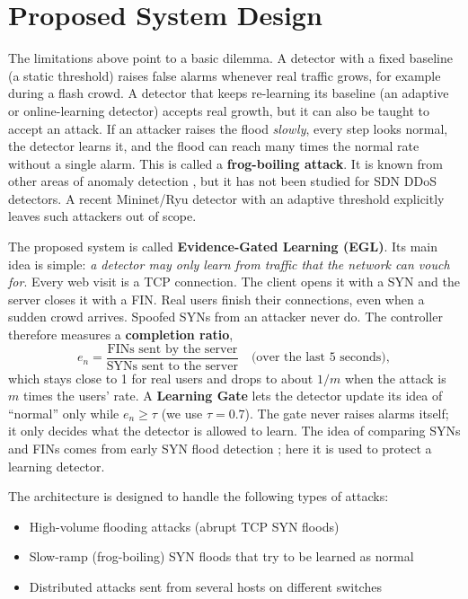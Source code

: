 \documentclass[12pt,a4paper]{article}
\begin{document}
\section{Proposed System Design}
The limitations above point to a basic dilemma. A detector with a fixed
baseline (a static threshold) raises false alarms whenever real traffic grows,
for example during a flash crowd. A detector that keeps re-learning its
baseline (an adaptive or online-learning detector) accepts real growth, but it
can also be taught to accept an attack. If an attacker raises the flood
\emph{slowly}, every step looks normal, the detector learns it, and the flood
can reach many times the normal rate without a single alarm. This is called a
\textbf{frog-boiling attack}. It is known from other areas of anomaly detection
\cite{antidote,chantin}, but it has not been studied for SDN DDoS detectors.
A recent Mininet/Ryu detector with an adaptive threshold \cite{zhang2026}
explicitly leaves such attackers out of scope.

The proposed system is called \textbf{Evidence-Gated Learning (EGL)}. Its main
idea is simple: \emph{a detector may only learn from traffic that the network
can vouch for}. Every web visit is a TCP connection. The client opens it with a
SYN and the server closes it with a FIN. Real users finish their connections,
even when a sudden crowd arrives. Spoofed SYNs from an attacker never do. The
controller therefore measures a \textbf{completion ratio},
\begin{equation}
  e_n = \frac{\text{FINs sent by the server}}{\text{SYNs sent to the server}}
  \quad\text{(over the last 5 seconds)},
\end{equation}
which stays close to 1 for real users and drops to about $1/m$ when the attack
is $m$ times the users' rate. A \textbf{Learning Gate} lets the detector update
its idea of ``normal'' only while $e_n \ge \tau$ (we use $\tau = 0.7$). The gate
never raises alarms itself; it only decides what the detector is allowed to
learn. The idea of comparing SYNs and FINs comes from early SYN flood detection
\cite{wang2002}; here it is used to protect a learning detector.

The architecture is designed to handle the following types of attacks:
\begin{itemize}
  \item High-volume flooding attacks (abrupt TCP SYN floods)
  \item Slow-ramp (frog-boiling) SYN floods that try to be learned as normal
  \item Distributed attacks sent from several hosts on different switches
\end{itemize}
\end{document}
